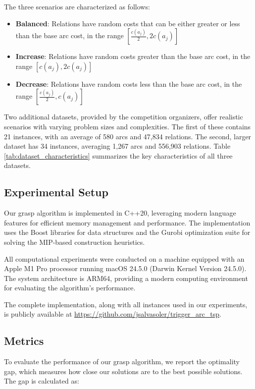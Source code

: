 \documentclass[twocolumn, switch]{article} %
\begin{document}
The three scenarios are characterized as follows:
\begin{itemize}
    \item \textbf{Balanced}: Relations have random costs that can be either greater or less than the base arc cost, in the range $[\frac{c(a_j)}{2}, 2c(a_j)]$
    \item \textbf{Increase}: Relations have random costs greater than the base arc cost, in the range $[c(a_j), 2c(a_j)]$
    \item \textbf{Decrease}: Relations have random costs less than the base arc cost, in the range $[\frac{c(a_j)}{2}, c(a_j)]$
\end{itemize}

Two additional datasets, provided by the competition organizers, offer realistic scenarios with varying problem sizes and complexities. The first of these contains 21 instances, with an average of 580 arcs and 47,834 relations. The second, larger dataset has 34 instances, averaging 1,267 arcs and 556,903 relations. Table \ref{tab:dataset_characteristics} summarizes the key characteristics of all three datasets.

\subsection{Experimental Setup}

Our \gls{grasp} algorithm is implemented in C++20, leveraging modern language features for efficient memory management and performance. The implementation uses the Boost libraries for data structures and the Gurobi optimization suite for solving the MIP-based construction heuristics.

All computational experiments were conducted on a machine equipped with an Apple M1 Pro processor running macOS 24.5.0 (Darwin Kernel Version 24.5.0). The system architecture is ARM64, providing a modern computing environment for evaluating the algorithm's performance.

The complete implementation, along with all instances used in our experiments, is publicly available at \url{https://github.com/jsalvasoler/trigger_arc_tsp}.

\subsection{Metrics}

To evaluate the performance of our \gls{grasp} algorithm, we report the optimality gap, which measures how close our solutions are to the best possible solutions. The gap is calculated as:
\end{document}
